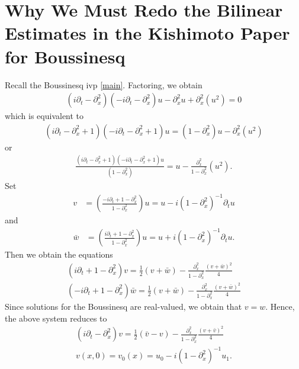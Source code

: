 \documentclass{amsart}
\newcommand{\p}{\partial}
\begin{document}
\section{Why We Must Redo the Bilinear Estimates in the
Kishimoto Paper for Boussinesq}
Recall the Boussinesq ivp \eqref{main}. Factoring, we obtain
%
%
\begin{equation*}
\begin{split}
  (i \p_{t} - \p_{x}^{2})(-i \p_{t} - \p_{x}^{2})u - \p_{x}^{2} u +
  \p_{x}^{2}(u^{2}) = 0
\end{split}
\end{equation*}
%
%
which is equivalent to
%
%
\begin{equation*}
\begin{split}
  (i \p_{t} - \p_{x}^{2} + 1)(-i \p_{t} - \p_{x}^{2} +1)u = (1 -
  \p_{x}^{2})u - \p_{x}^{2}(u^{2})
\end{split}
\end{equation*}
%
%
or
%
%
\begin{equation*}
\begin{split}
  \frac{(i \p_{t} - \p_{x}^{2} + 1)(-i \p_{t} - \p_{x}^{2} +1)u}{(1 -
  \p_{x}^{2})} = u - \frac{\p_{x}^{2}}{1 - \p_{x}^{2}}(u^{2}). 
\end{split}
\end{equation*}
%
%
Set
%
%
\begin{equation*}
\begin{split}
  v & = \left( \frac{-i \p_{t} + 1 -\p_{x}^{2}}{1 - \p_{x}^{2}} \right)u
  = u - i(1 - \p_{x}^{2})^{-1} \p_{t}u
\end{split}
\end{equation*}
and
\begin{equation*}
  \begin{split}
    \bar{w} & = \left( \frac{i \p_{t} + 1 -\p_{x}^{2}}{1 - \p_{x}^{2}} \right)u
  = u + i(1 - \p_{x}^{2})^{-1} \p_{t}u.
\end{split}
\end{equation*}
%
Then we obtain the equations
\begin{gather*}
  (i \p_{t} + 1 - \p_{x}^{2})v = \frac{1}{2}(v + \bar{w}) -
  \frac{\p_{x}^{2}}{1 - \p_{x}^{2}} \frac{(v + \bar{w})^{2}}{4}
  \\
  (-i \p_{t} + 1 - \p_{x}^{2})\bar{w}= \frac{1}{2}(v + \bar{w}) -
  \frac{\p_{x}^{2}}{1 - \p_{x}^{2}} \frac{(v + \bar{w})^{2}}{4}
\end{gather*}
%
Since solutions for the Boussinesq are real-valued, we obtain that $v=w$. Hence,
the above system reduces to 
\begin{gather}
  \label{simp-sys}
  (i \p_{t} - \p_{x}^{2})v = \frac{1}{2}(\bar{v} -v) -
  \frac{\p_{x}^{2}}{1 - \p_{x}^{2}} \frac{(v + \bar{v})^{2}}{4}
  \\
  v(x,0) = v_{0}(x) = u_{0} - i(1 - \p_{x}^{2})^{-1}u_{1}.
  \label{simp-sys-init}
\end{gather}
\end{document}
